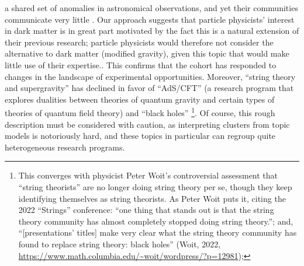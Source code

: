 \documentclass{article}
\begin{document}
{a shared set of anomalies in astronomical observations, and yet their communities communicate very little \citep{Martens2023,martens2022integrating}. Our approach suggests that particle physicists' interest in dark matter is in great part motivated by the fact this is a natural extension of their previous research; particle physicists would therefore not consider the alternative to dark matter (modified gravity), given this topic that would make little use of their expertise.}. This confirms that the cohort has responded to changes in the landscape of experimental opportunities. Moreover, ``string theory and supergravity'' has declined in favor of ``AdS/CFT'' (a research program that explores dualities between theories of quantum gravity and certain types of theories of quantum field theory) and ``black holes'' \footnote{This converges with physicist Peter Woit's controversial assessment that ``string theorists'' are no longer doing string theory per se, though they keep identifying themselves as string theorists. As Peter Woit puts it, citing the 2022 ``Strings'' conference: ``one thing that stands out is that the string theory community has almost completely stopped doing string theory.''; and, ``[presentations' titles] make very clear what the string theory community has found to replace string theory: black holes'' (Woit, 2022, \url{https://www.math.columbia.edu/~woit/wordpress/?p=12981});}. Of course, this rough description must be considered with caution, as interpreting clusters from topic models is notoriously hard, and these topics in particular can regroup quite heterogeneous research programs.
\end{document}
